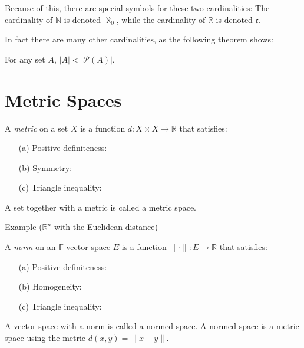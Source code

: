 \documentclass [aspectratio=169]{beamer}
\newcommand{\R}{{\mathbb{R}}}
\newcommand{\F}{{\mathbb{F}}}
\newcommand{\N}{{\mathbb{N}}}
\newcommand{\cP}{\mathcal{P}}
\begin{document}
\begin{frame}
Because of this, there are special symbols for these two cardinalities: The cardinality of $\N$ is denoted $\aleph_0$, while the cardinality of $\R$ is denoted $\mathfrak{c}$. 

In fact there are many other cardinalities, as the following theorem shows: 
\begin{theorem}
     For any set $A$, $|A| < |\cP(A)|$.
\end{theorem}
\vspace{3cm}
\end{frame}

\section{Metric Spaces}

\begin{frame}
\begin{definition}[Metric]
A \emph{metric} on a set $X$ is a function $d:X \times X \to \R$ that satisfies:
\vspace{0.5em}
\begin{enumerate}
 \setlength\itemsep{1em}
    \item[(a)] Positive definiteness: 
    \item[(b)] Symmetry: 
    \item[(c)] Triangle inequality: 
\end{enumerate}
\vspace{0.5em}
A set together with a metric is called a metric space.
\end{definition}
\end{frame}

\begin{frame}
\begin{exampleblock}{Example ($\R^n$ with the Euclidean distance)}
\vspace{4cm}
\end{exampleblock}
\end{frame}


\begin{frame}
\begin{definition}[Norm]
A \emph{norm} on an $\F$-vector space $E$ is a function $\|\cdot\|:E \to \R$ that satisfies:
\vspace{0.5em}
\begin{enumerate}
 \setlength\itemsep{0.5em}
    \item[(a)] Positive definiteness: 
    \item[(b)] Homogeneity: 
    \item[(c)] Triangle inequality: 
\end{enumerate}
\vspace{0.5em}
A vector space with a norm is called a normed space. A normed space is a metric space using the metric $d(x,y) = \| x-y \|$.
\end{definition}

\end{frame}
\end{document}
